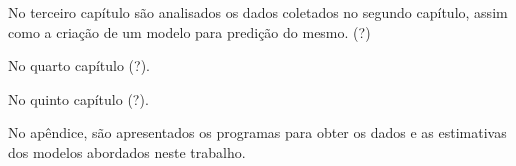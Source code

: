 No terceiro capítulo são analisados os dados coletados no segundo capítulo, assim como a criação de um modelo para predição do mesmo. (?)

No quarto capítulo (?).

No quinto capítulo (?). %

No apêndice, são apresentados os programas para obter os dados e as estimativas dos modelos abordados neste trabalho.

